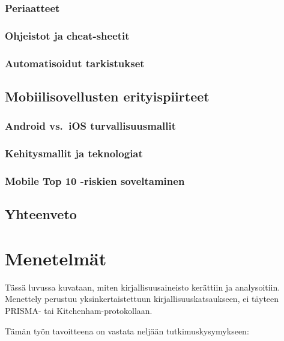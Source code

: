 \documentclass[bscthesis,finnish,oneside,biblatex]{uefcsthesis}
\begin{document}
  \subsection{Periaatteet}
  \subsection{Ohjeistot ja cheat-sheetit}
  \subsection{Automatisoidut tarkistukset}

\section{Mobiilisovellusten erityispiirteet}
\label{sec:mobile}
  \subsection{Android vs.\ iOS turvallisuusmallit}
  \subsection{Kehitysmallit ja teknologiat}
  \subsection{Mobile Top 10 -riskien soveltaminen}

\section{Yhteenveto}
\label{sec:teoria-yhteenveto}

\chapter{Menetelmät}
\label{cha:methods}

Tässä luvussa kuvataan, miten kirjallisuusaineisto kerättiin ja analysoitiin.
Menettely perustuu yksinkertaistettuun kirjallisuuskatsaukseen, ei täyteen
PRISMA- tai Kitchenham-protokollaan.

Tämän työn tavoitteena on vastata neljään tutkimuskysymykseen:
\end{document}
